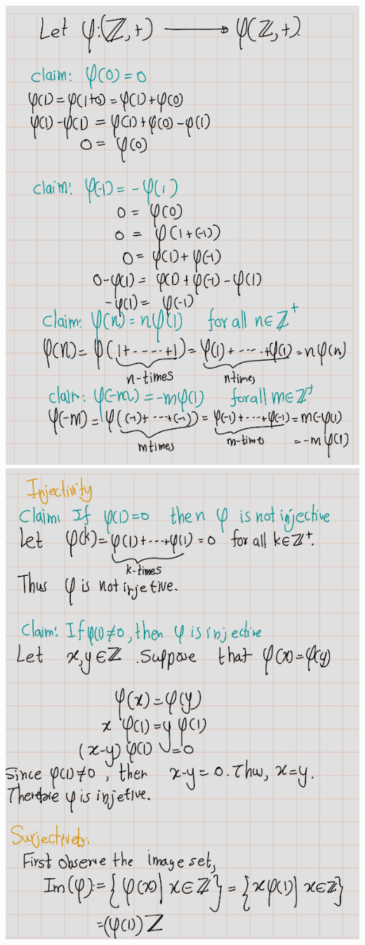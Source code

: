 \documentclass[
]{book}
\theoremstyle{definition}
\theoremstyle{definition}
\theoremstyle{definition}
\theoremstyle{definition}
\theoremstyle{remark}
\begin{document}
\includegraphics{figures/ch_2/fig79.png}
\includegraphics{figures/ch_2/fig80.png}
\end{document}

